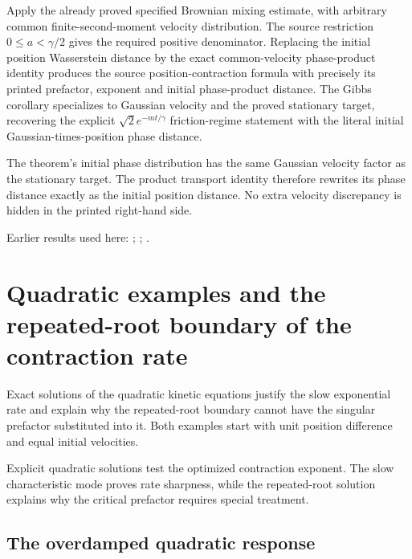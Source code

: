 \documentclass[11pt,a4paper]{report}
\begin{document}
Apply the already proved specified Brownian mixing estimate, with arbitrary common finite-second-moment velocity distribution. The source restriction \(0\le a<\gamma/2\) gives the required positive denominator. Replacing the initial position Wasserstein distance by the exact common-velocity phase-product identity produces the source position-contraction formula with precisely its printed prefactor, exponent and initial phase-product distance. The Gibbs corollary specializes to Gaussian velocity and the proved stationary target, recovering the explicit \(\sqrt2 e^{-mt/\gamma}\) friction-regime statement with the literal initial Gaussian-times-position phase distance.



The theorem’s initial phase distribution has the same Gaussian velocity factor as the stationary target. The product transport identity therefore rewrites its phase distance exactly as the initial position distance. No extra velocity discrepancy is hidden in the printed right-hand side.



Earlier results used here: \cite[Section~3.17.4]{LangevinLean2026ULASC}; \cite[Section~3.26.13]{LangevinLean2026ULASC}; \cite[Section~3.26.3]{LangevinLean2026ULASC}.
\section{\texorpdfstring{Quadratic examples and the repeated-root boundary of the contraction rate}{Quadratic examples and the repeated-root boundary of the contraction rate}}
\label{proof-module-KineticLangevin-QuadraticSharpness-lean}


Exact solutions of the quadratic kinetic equations justify the slow exponential rate and explain why the repeated-root boundary cannot have the singular prefactor substituted into it. Both examples start with unit position difference and equal initial velocities.



Explicit quadratic solutions test the optimized contraction exponent. The slow characteristic mode proves rate sharpness, while the repeated-root solution explains why the critical prefactor requires special treatment.

\subsection{\texorpdfstring{The overdamped quadratic response}{The overdamped quadratic response}}
\label{report-step-KineticLangevin-QuadraticSharpness-lean-1}
\end{document}
